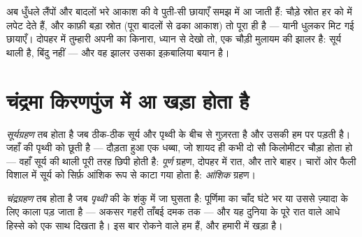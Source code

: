 \begin{example}[हर जगह मुलायम किनारे]\label{ex:g7:shadows-eclipses:soft}
अब धुँधले लैंपों और बादलों भरे आकाश की वे पुती-सी छायाएँ समझ में आ
जाती हैं: चौड़े स्रोत हर  को  में लपेट देते हैं, और काफ़ी
बड़ा स्रोत (पूरा बादलों से ढका आकाश) तो पूरा ही  है --- यानी
धुलकर मिट गई छायाएँ। दोपहर में तुम्हारी अपनी  का किनारा, ध्यान से
देखो तो, एक  चौड़ी मुलायम  की झालर है: सूर्य थाली है,
बिंदु नहीं --- और वह झालर उसका इक़बालिया बयान है।
\end{example}

\section{चंद्रमा किरणपुंज में आ खड़ा होता है}

\begin{definition}[सूर्यग्रहण]\label{def:g7:shadows-eclipses:solar}
\emph{सूर्यग्रहण} तब होता है जब  ठीक-ठीक
सूर्य और पृथ्वी के बीच से गुज़रता है और उसकी  हम पर पड़ती है।
जहाँ  की \emph{} पृथ्वी को छूती है --- दौड़ता हुआ एक
धब्बा, जो शायद ही कभी दो सौ किलोमीटर चौड़ा होता हो --- वहाँ सूर्य की
थाली पूरी तरह छिपी होती है: \emph{पूर्ण} ग्रहण, दोपहर में रात, और तारे
बाहर। चारों ओर फैली विशाल \emph{} में सूर्य को सिर्फ़ आंशिक
रूप से काटा गया होता है: \emph{आंशिक} ग्रहण।
\end{definition}

\begin{definition}[चंद्रग्रहण]\label{def:g7:shadows-eclipses:lunar}
\emph{चंद्रग्रहण} तब होता है जब \emph{}
\emph{पृथ्वी} की  के शंकु में जा घुसता है: पूर्णिमा का चाँद घंटे
भर या उससे ज़्यादा के लिए काला पड़ जाता है --- अकसर गहरी ताँबई दमक तक
--- और यह दुनिया के पूरे रात वाले आधे हिस्से को एक साथ दिखता है। इस
बार रोकने वाले हम हैं, और  हमारी  में खड़ा है।
\end{definition}

